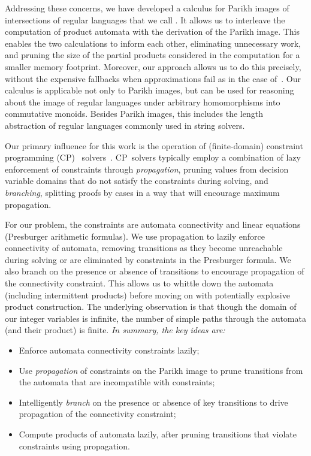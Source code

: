 Addressing these concerns, we have developed a calculus for Parikh images of
intersections of regular languages that we call \Calculus{}. It allows us to
interleave the computation of product automata with the derivation of the
Parikh image. This enables the two
calculations to inform each other, eliminating unnecessary work, and pruning the
size of the partial products considered in the computation for a smaller memory
footprint.
Moreover, our approach allows us to do this precisely, without the expensive
fallbacks when approximations fail as in the case of~\cite{approximate-parikh}.
%
Our calculus is applicable not only to Parikh images,
but can be used for reasoning about the image of regular languages under
arbitrary homomorphisms into commutative monoids. Besides Parikh images,
this includes the length abstraction of regular languages commonly used in
string solvers.

Our primary influence for this work is the operation of (finite-domain) 
constraint programming (CP)%
~solvers~\cite{cp}. CP~solvers typically employ a combination of lazy enforcement
of constraints through \emph{propagation},
pruning values from decision variable domains that do not satisfy 
the constraints during solving, and \emph{branching}, splitting proofs
by cases in a way that will encourage maximum propagation.

For our problem, the constraints are automata connectivity and linear
equations (Presburger arithmetic formulas).
We use propagation to lazily enforce connectivity of automata,
removing transitions as they become unreachable during solving or are
eliminated by constraints in the Presburger formula. We
also branch on the presence or absence of transitions to
encourage propagation of the connectivity constraint. This allows
us to whittle down the automata
(including intermittent products) before moving on with potentially
 explosive product construction. The underlying observation
is that though the domain of our integer variables
is infinite, the number of simple paths
through the automata (and their product) is finite.
\emph{In summary, the key ideas are:}

{
    \centering
    \begin{tcolorbox}[colback=ourcolour!5!white,colframe=ourcolour!75!black,%
        title=Key paradigms in \Calculus{},%
        width=0.9\linewidth]

        \begin{itemize}
            \item Enforce automata connectivity constraints lazily;
            \item Use \emph{propagation} of constraints on the Parikh image to prune
            transitions from the automata that are incompatible with constraints;
            \item Intelligently \emph{branch} on the presence or absence of key
             transitions to drive propagation of the connectivity constraint;
             \item Compute products of automata lazily, after pruning transitions
             that violate constraints using propagation.
        \end{itemize}
    \end{tcolorbox}
  }

